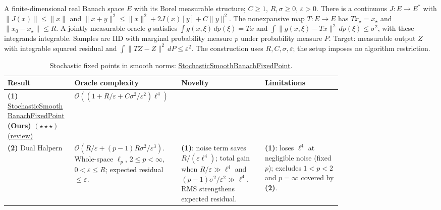 \begin{table}[tp]
\centering
\caption{Stochastic fixed points in smooth norms: \href{https://github.com/k3nfalt/longtails/blob/main/LongTails/Setups/StochasticSmoothBanachFixedPoint.lean}{StochasticSmoothBanachFixedPoint}.}\label{tab:StochasticSmoothBanachFixedPoint}
\parbox{\linewidth}{\footnotesize
A finite-dimensional real Banach space $E$ with its Borel measurable structure; $C\geq1$, $R,\sigma\geq0$, $\varepsilon>0$. There is a continuous $J:E\to E^*$ with $\|J(x)\|\leq\|x\|$ and $\|x+y\|^2\leq\|x\|^2+2J(x)[y]+C\|y\|^2$. The nonexpansive map $T:E\to E$ has $Tx_\star=x_\star$ and $\|x_0-x_\star\|\leq R$. A jointly measurable oracle $g$ satisfies $\int g(x,\xi)\,dp(\xi)=Tx$ and $\int\|g(x,\xi)-Tx\|^2\,dp(\xi)\leq\sigma^2$, with these integrands integrable. Samples are IID with marginal probability measure $p$ under probability measure $P$. Target: measurable output $Z$ with integrable squared residual and $\int\|TZ-Z\|^2\,dP\leq\varepsilon^2$. The construction uses $R,C,\sigma,\varepsilon$; the setup imposes no algorithm restriction.}\par\smallskip
\begin{threeparttable}
\footnotesize
\setlength{\tabcolsep}{4pt}\renewcommand{\arraystretch}{1.25}
\begin{tabularx}{\linewidth}{@{}>{\raggedright\arraybackslash}p{0.20\linewidth}>{\raggedright\arraybackslash}p{0.32\linewidth}>{\raggedright\arraybackslash}p{0.25\linewidth}>{\raggedright\arraybackslash}X@{}}
\toprule
\textbf{Result} & \textbf{Oracle complexity} & \textbf{Novelty} & \textbf{Limitations} \\
\midrule
\textbf{(1)} \href{https://github.com/k3nfalt/longtails/blob/main/LongTails/Theorems/StochasticSmoothBanachFixedPoint.lean}{Stochastic\allowbreak Smooth\allowbreak Banach\allowbreak Fixed\allowbreak Point} \textbf{(Ours)} $(\star\star\star)$ \href{https://github.com/k3nfalt/longtails/blob/main/scripts/reviews/StochasticSmoothBanachFixedPoint.md}{(review)}
& $\mathcal{O}\!\left((1+R/\varepsilon+C\sigma^2/\varepsilon^2)\ell^4\right)$ & & \\
\midrule[1.2pt]
\textbf{(2)} Dual Halpern \citep[Thm.~3]{ssbfpLee2026v1}
& $\mathcal{O}\!\left(R/\varepsilon+(p-1)R\sigma^2/\varepsilon^3\right)$.
Whole-space $\ell_p$, $2\leq p<\infty$, $0<\varepsilon\leq R$; expected residual $\leq\varepsilon$.
& \textbf{(1)}: noise term saves $R/(\varepsilon\ell^4)$; total gain when $R/\varepsilon\gg\ell^4$ and $(p-1)\sigma^2/\varepsilon^2\gg\ell^4$. RMS strengthens expected residual.
& \textbf{(1)}: loses $\ell^4$ at negligible noise (fixed $p$); excludes $1<p<2$ and $p=\infty$ covered by \textbf{(2)}. \\

\end{tabularx}
\end{threeparttable}
\end{table}
